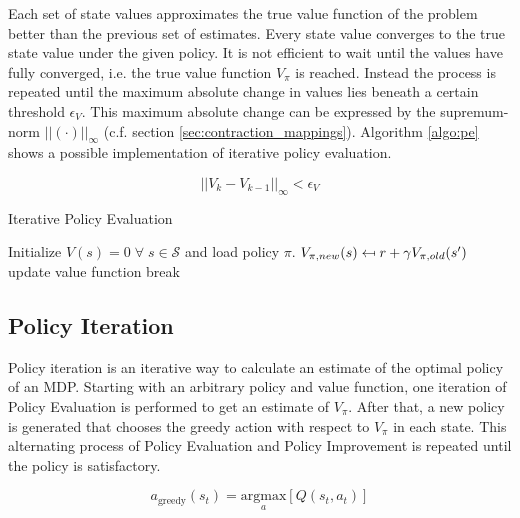 Each set of state values approximates the true value function of the problem better than the previous set of estimates. Every state value converges to the true state value under the given policy. It is not efficient to wait until the values have fully converged, i.e. the true value function $V_\pi$ is reached. Instead the process is repeated until the maximum absolute change in values lies beneath a certain threshold $\epsilon_V$. This maximum absolute change can be expressed by the supremum-norm $||(\cdot)||_\infty$ (c.f. section \ref{sec:contraction_mappings}). Algorithm \ref{algo:pe} shows a possible implementation of iterative policy evaluation.

\begin{equation}
||V_{k}-V_{k-1}||_\infty<\epsilon_V
\label{eq:pe_stopping_criterion}
\end{equation}

\begin{algorithm}[hbt]
	\caption{Iterative Policy Evaluation}
	\begin{algorithmic}[0] %
		
			\State Initialize $V(s) = 0 \; \forall \; s \in \mathcal{S}$ and load policy $\pi$.
					\State $V_{\pi,new}(s) \mathrel{\reflectbox{\ensuremath{\mapsto}}} r+\gamma V_ {\pi,old}(s')$
				\EndFor
				\State update value function
					\State break
				\EndIf
			\EndWhile
		\EndFunction
	\end{algorithmic}
	\label{algo:pe}
\end{algorithm}

\subsection{Policy Iteration}
\label{sec:PI}
Policy iteration is an iterative way to calculate an estimate of the optimal policy of an MDP. Starting with an arbitrary policy and value function, one iteration of Policy Evaluation is performed to get an estimate of $V_\pi$. After that, a new policy is generated that chooses the greedy action with respect to $V_\pi$ in each state. This alternating process of Policy Evaluation and Policy Improvement is repeated until the policy is satisfactory.

\begin{equation}
a_{\text{greedy}}(s_t) = \underset{a}{\text{argmax}}[Q(s_t,a_t)]
\end{equation}

